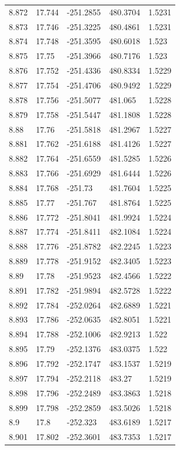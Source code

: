 \begin{tabular}{lllll}
8.872 & 17.744 & -251.2855 & 480.3704 & 1.5231 \\
8.873 & 17.746 & -251.3225 & 480.4861 & 1.5231 \\
8.874 & 17.748 & -251.3595 & 480.6018 & 1.523 \\
8.875 & 17.75 & -251.3966 & 480.7176 & 1.523 \\
8.876 & 17.752 & -251.4336 & 480.8334 & 1.5229 \\
8.877 & 17.754 & -251.4706 & 480.9492 & 1.5229 \\
8.878 & 17.756 & -251.5077 & 481.065 & 1.5228 \\
8.879 & 17.758 & -251.5447 & 481.1808 & 1.5228 \\
8.88 & 17.76 & -251.5818 & 481.2967 & 1.5227 \\
8.881 & 17.762 & -251.6188 & 481.4126 & 1.5227 \\
8.882 & 17.764 & -251.6559 & 481.5285 & 1.5226 \\
8.883 & 17.766 & -251.6929 & 481.6444 & 1.5226 \\
8.884 & 17.768 & -251.73 & 481.7604 & 1.5225 \\
8.885 & 17.77 & -251.767 & 481.8764 & 1.5225 \\
8.886 & 17.772 & -251.8041 & 481.9924 & 1.5224 \\
8.887 & 17.774 & -251.8411 & 482.1084 & 1.5224 \\
8.888 & 17.776 & -251.8782 & 482.2245 & 1.5223 \\
8.889 & 17.778 & -251.9152 & 482.3405 & 1.5223 \\
8.89 & 17.78 & -251.9523 & 482.4566 & 1.5222 \\
8.891 & 17.782 & -251.9894 & 482.5728 & 1.5222 \\
8.892 & 17.784 & -252.0264 & 482.6889 & 1.5221 \\
8.893 & 17.786 & -252.0635 & 482.8051 & 1.5221 \\
8.894 & 17.788 & -252.1006 & 482.9213 & 1.522 \\
8.895 & 17.79 & -252.1376 & 483.0375 & 1.522 \\
8.896 & 17.792 & -252.1747 & 483.1537 & 1.5219 \\
8.897 & 17.794 & -252.2118 & 483.27 & 1.5219 \\
8.898 & 17.796 & -252.2489 & 483.3863 & 1.5218 \\
8.899 & 17.798 & -252.2859 & 483.5026 & 1.5218 \\
8.9 & 17.8 & -252.323 & 483.6189 & 1.5217 \\
8.901 & 17.802 & -252.3601 & 483.7353 & 1.5217 \\

\end{tabular}
